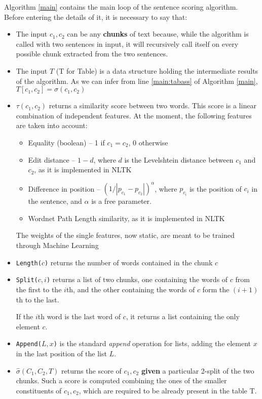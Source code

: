 Algorithm \ref{main} contains the main loop of the sentence scoring algorithm. Before entering the details of it, it is necessary to say that:
\begin{itemize}
\item The input $c_1,c_2$ can be any \textbf{chunks} of text because, while the algorithm is called with two sentences in input, it will recursively call itself on every possible chunk extracted from the two sentences.
\item The input $T$ (T for Table) is a data structure holding the intermediate results of the algorithm. As we can infer from line \ref{main:tabass} of Algorithm \ref{main}, $T[c_1,c_2]=\sigma(c_1,c_2)$
\item $\tau(c_1,c_2)$ returns a similarity score between two words. This score is a linear combination of independent features. At the moment, the following features are taken into account:
\begin{itemize}
\item Equality (boolean) -- 1 if $c_1=c_2$, 0 otherwise
\item Edit distance -- $1-d$, where $d$ is the Levelshtein distance \citep{levelshtein-66-binary} between $c_1$ and $c_2$, as it is implemented in NLTK \citep{Loper:2002:NNL:1118108.1118117}
\item Difference in position -- $(1/|p_{c_1}-p_{c_2}|)^\alpha$, where $p_{c_i}$ is the position of $c_i$ in the sentence, and $\alpha$ is a free parameter.
\item Wordnet \citep{Miller:1995:WLD:219717.219748} Path Length similarity, as it is implemented in NLTK
\end{itemize}
The weights of the single features, now static, are meant to be trained through Machine Learning
\item \texttt{Length($c$)} returns the number of words contained in the chunk $c$
\item \texttt{Split($c,i$)} returns a list of two chunks, one containing the words of $c$ from the first to the $i$th, and the other containing the words of $c$ form the $(i+1)$th to the last.

If the $i$th word is the last word of $c$, it returns a list containing the only element $c$.
\item \texttt{Append($L,x$)} is the standard \emph{append} operation for lists, adding the element $x$ in the last position of the list $L$.
\item $\hat{\sigma}(C_1,C_2,T)$ returns the score of $c_1,c_2$ \textbf{given} a particular 2-split of the two chunks. Such a score is computed combining the ones of the smaller constituents of $c_1,c_2$, which are required to be already present in the table T.


\end{itemize}
